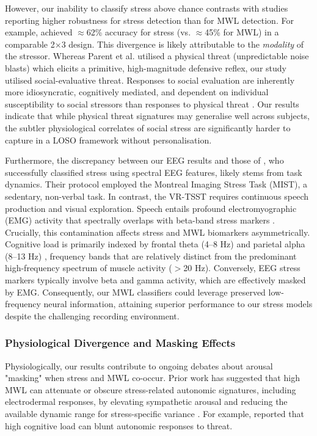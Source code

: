 \documentclass[lettersize,journal]{IEEEtran}
\begin{document}
However, our inability to classify stress above chance contrasts with studies reporting higher robustness for stress detection than for MWL detection. For example, \cite{parentDiagnosticityPsychophysiologicalSignatures2019} achieved $\approx$62\% accuracy for stress (vs. $\approx$45\% for MWL) in a comparable 2$\times$3 design. This divergence is likely attributable to the \textit{modality} of the stressor. Whereas Parent et al. utilised a physical threat (unpredictable noise blasts) which elicits a primitive, high-magnitude defensive reflex, our study utilised social-evaluative threat. Responses to social evaluation are inherently more idiosyncratic, cognitively mediated, and dependent on individual susceptibility to social stressors than responses to physical threat \cite{campbell-sillsPsychometricPropertiesSubjective2006}. Our results indicate that while physical threat signatures may generalise well across subjects, the subtler physiological correlates of social stress are significantly harder to capture in a LOSO framework without personalisation.

Furthermore, the discrepancy between our EEG results and those of \cite{bagheriSimultaneousClassificationBoth2022}, who successfully classified stress using spectral EEG features, likely stems from task dynamics. Their protocol employed the Montreal Imaging Stress Task (MIST), a sedentary, non-verbal task. In contrast, the VR-TSST requires continuous speech production and visual exploration. Speech entails profound electromyographic (EMG) activity that spectrally overlaps with beta-band stress markers \cite{goncharovaEMGContaminationEEG2003}. Crucially, this contamination affects stress and MWL biomarkers asymmetrically. Cognitive load is primarily indexed by frontal theta (4--8 Hz) and parietal alpha (8--13 Hz) \cite{klimeschEEGAlphaTheta1999}, frequency bands that are relatively distinct from the predominant high-frequency spectrum of muscle activity ($>$20 Hz). Conversely, EEG stress markers typically involve beta and gamma activity, which are effectively masked by EMG. Consequently, our MWL classifiers could leverage preserved low-frequency neural information, attaining superior performance to our stress models despite the challenging recording environment.

\subsubsection{Physiological Divergence and Masking Effects}
Physiologically, our results contribute to ongoing debates about arousal "masking" when stress and MWL co-occur. Prior work has suggested that high MWL can attenuate or obscure stress-related autonomic signatures, including electrodermal responses, by elevating sympathetic arousal and reducing the available dynamic range for stress-specific variance \cite{conwayEffectStressCognitive2013, setzDiscriminatingStressCognitive2010}. For example, \cite{conwayEffectStressCognitive2013} reported that high cognitive load can blunt autonomic responses to threat.
\end{document}

